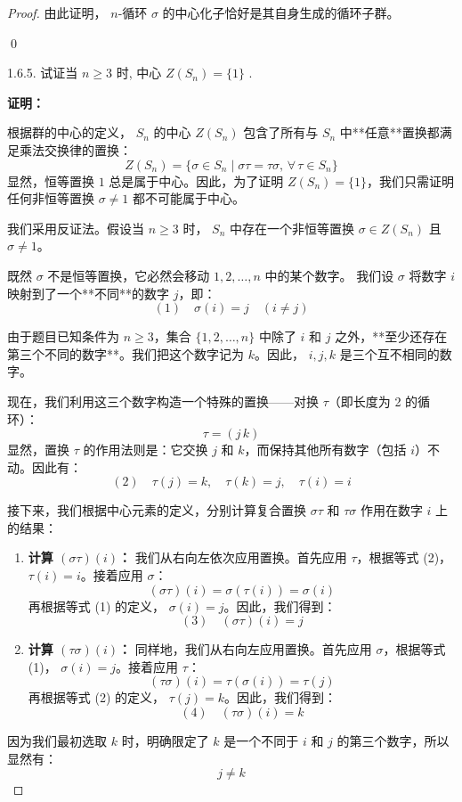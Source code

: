 \documentclass[]{article}
\begin{document}
\begin{proof}
由此证明， $n$-循环 $\sigma$ 的中心化子恰好是其自身生成的循环子群。

\qed

1.6.5. 试证当 $n \geqslant 3$ 时, 中心 $Z(S_{n}) = \{1\}$ . 

\bigskip
\noindent \textbf{证明：} 

根据群的中心的定义， $S_n$ 的中心 $Z(S_n)$ 包含了所有与 $S_n$ 中**任意**置换都满足乘法交换律的置换：
\[ Z(S_n) = \{ \sigma \in S_n \mid \sigma \tau = \tau \sigma, \, \forall \, \tau \in S_n \} \]
显然，恒等置换 $1$ 总是属于中心。因此，为了证明 $Z(S_n) = \{1\}$，我们只需证明任何非恒等置换 $\sigma \neq 1$ 都不可能属于中心。

我们采用反证法。假设当 $n \ge 3$ 时， $S_n$ 中存在一个非恒等置换 $\sigma \in Z(S_n)$ 且 $\sigma \neq 1$。

\bigskip
既然 $\sigma$ 不是恒等置换，它必然会移动 $1, 2, \dots, n$ 中的某个数字。
我们设 $\sigma$ 将数字 $i$ 映射到了一个**不同**的数字 $j$，即：
\[ (1) \quad \sigma(i) = j \quad (i \neq j) \]

由于题目已知条件为 $n \ge 3$，集合 $\{1, 2, \dots, n\}$ 中除了 $i$ 和 $j$ 之外，**至少还存在第三个不同的数字**。我们把这个数字记为 $k$。因此， $i, j, k$ 是三个互不相同的数字。

现在，我们利用这三个数字构造一个特殊的置换——对换 $\tau$（即长度为 2 的循环）：
\[ \tau = (j\,k) \]
显然，置换 $\tau$ 的作用法则是：它交换 $j$ 和 $k$，而保持其他所有数字（包括 $i$）不动。因此有：
\[ (2) \quad \tau(j) = k, \quad \tau(k) = j, \quad \tau(i) = i \]

接下来，我们根据中心元素的定义，分别计算复合置换 $\sigma \tau$ 和 $\tau \sigma$ 作用在数字 $i$ 上的结果：

\begin{enumerate}
	\item \textbf{计算 $(\sigma \tau)(i)$：}
	我们从右向左依次应用置换。首先应用 $\tau$，根据等式 (2)， $\tau(i) = i$。接着应用 $\sigma$：
	\[ (\sigma \tau)(i) = \sigma(\tau(i)) = \sigma(i) \]
	再根据等式 (1) 的定义， $\sigma(i) = j$。因此，我们得到：
	\[ (3) \quad (\sigma \tau)(i) = j \]
	
	\item \textbf{计算 $(\tau \sigma)(i)$：}
	同样地，我们从右向左应用置换。首先应用 $\sigma$，根据等式 (1)， $\sigma(i) = j$。接着应用 $\tau$：
	\[ (\tau \sigma)(i) = \tau(\sigma(i)) = \tau(j) \]
	再根据等式 (2) 的定义， $\tau(j) = k$。因此，我们得到：
	\[ (4) \quad (\tau \sigma)(i) = k \]
\end{enumerate}

因为我们最初选取 $k$ 时，明确限定了 $k$ 是一个不同于 $i$ 和 $j$ 的第三个数字，所以显然有：
\[ j \neq k \]


\end{proof}
\end{document}
